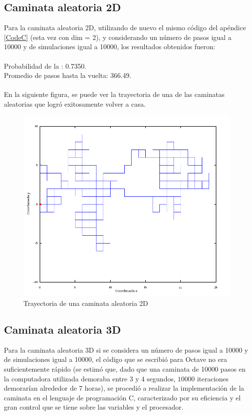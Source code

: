 \documentclass[a4paper,10pt]{article}
\begin{document}
\subsection*{Caminata aleatoria 2D}
Para la caminata aleatoria 2D, utilizando de nuevo el mismo c\'odigo del ap\'endice \ref{CodeC} (esta vez con dim = 2), y considerando
 un n\'umero de pasos igual a 10000 y de simulaciones igual a 10000, los resultados obtenidos fueron:
\\
\\ Probabilidad de la : 0.7350.
\\ Promedio de pasos hasta la vuelta: 366.49.
\\
\\ En la siguiente figura, se puede ver la trayectoria de una de las caminatas aleatorias que logr\'o exitosamente volver a casa.
\begin{center}
  \begin{figure}[H]
  \includegraphics[scale=0.5]{./images/rec2edit.png}
    \caption{Trayectoria de una caminata aleatoria 2D}
  \end{figure}
\end{center} 
\subsection*{Caminata aleatoria 3D}
Para la caminata aleatoria 3D si se considera un n\'umero de pasos igual a 10000 y de simulaciones igual a 10000, el c\'odigo que 
se escribi\'o para Octave no era suficientemente r\'apido (se estimó que, dado que una caminata de 10000 pasos en la computadora
utilizada demoraba entre $3$ y $4$ segundos, $10000$ iteraciones demorar\'ian alrededor de 7 horas), se procedi\'o a realizar la
implementación de la caminata en el lenguaje de programaci\'on C, caracterizado por su eficiencia y el gran control que se tiene 
sobre las variables y el procesador.
\end{document}
